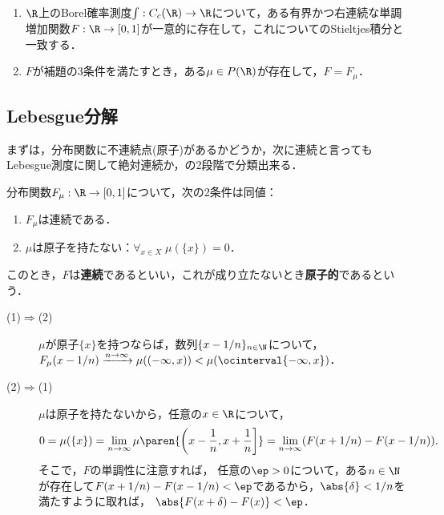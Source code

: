 \documentclass[uplatex,dvipdfmx]{jsreport}
\begin{document}
\begin{theorem}\mbox{}
    \begin{enumerate}
        \item $\R$上のBorel確率測度$\int:C_c(\R)\to\R$について，ある有界かつ右連続な単調増加関数$F:\R\to[0,1]$が一意的に存在して，これについてのStieltjes積分と一致する．
        \item $F$が補題の3条件を満たすとき，ある$\mu\in P(\R)$が存在して，$F=F_\mu$．
    \end{enumerate}
\end{theorem}

\subsection{Lebesgue分解}

\begin{tcolorbox}[colframe=ForestGreen, colback=ForestGreen!10!white,breakable,colbacktitle=ForestGreen!40!white,coltitle=black,fonttitle=\bfseries\sffamily,
title=]
    まずは，分布関数に不連続点(原子)があるかどうか，次に連続と言ってもLebesgue測度に関して絶対連続か，の2段階で分類出来る．
\end{tcolorbox}

\begin{lemma}
    分布関数$F_\mu:\R\to[0,1]$について，次の2条件は同値：
    \begin{enumerate}
        \item $F_\mu$は連続である．
        \item $\mu$は原子を持たない：$\forall_{x\in X}\;\mu(\{x\})=0$．
    \end{enumerate}
    このとき，$F$は\textbf{連続}であるといい，これが成り立たないとき\textbf{原子的}であるという．
\end{lemma}
\begin{Proof}\mbox{}
    \begin{description}
        \item[(1)$\Rightarrow$(2)] $\mu$が原子$\{x\}$を持つならば，数列$\{x-1/n\}_{n\in\N}$について，$F_\mu(x-1/n)\xrightarrow{n\to\infty}\mu((-\infty,x))<\mu(\ocinterval{-\infty,x})$．
        \item[(2)$\Rightarrow$(1)] $\mu$は原子を持たないから，任意の$x\in\R$について，
        \[0=\mu(\{x\})=\lim_{n\to\infty}\mu\paren{\left(x-\frac{1}{n},x+\frac{1}{n}\right]}=\lim_{n\to\infty}(F(x+1/n)-F(x-1/n)).\]
        そこで，$F$の単調性に注意すれば，
        任意の$\ep>0$について，ある$n\in\N$が存在して$F(x+1/n)-F(x-1/n)<\ep$であるから，$\abs{\delta}<1/n$を満たすように取れば，
        $\abs{F(x+\delta)-F(x)}<\ep$．
    \end{description}
\end{Proof}
\end{document}
